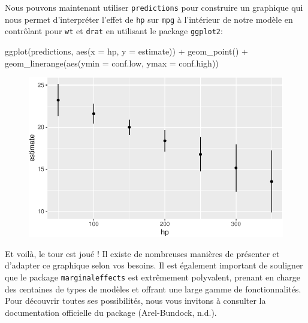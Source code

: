\documentclass[
  letterpaper,
  DIV=11,
  numbers=noendperiod]{scrreprt}
\newenvironment{Shaded}{\begin{snugshade}}{\end{snugshade}}
\newcommand{\AttributeTok}[1]{\textcolor[rgb]{0.40,0.45,0.13}{#1}}
\newcommand{\FunctionTok}[1]{\textcolor[rgb]{0.28,0.35,0.67}{#1}}
\newcommand{\NormalTok}[1]{\textcolor[rgb]{0.00,0.23,0.31}{#1}}
\newcommand{\SpecialCharTok}[1]{\textcolor[rgb]{0.37,0.37,0.37}{#1}}
\begin{document}
Nous pouvons maintenant utiliser \texttt{predictions} pour construire un
graphique qui nous permet d'interpréter l'effet de \texttt{hp} sur
\texttt{mpg} à l'intérieur de notre modèle en contrôlant pour
\texttt{wt} et \texttt{drat} en utilisant le package \texttt{ggplot2}:

\begin{Shaded}
\begin{Highlighting}[]
\FunctionTok{ggplot}\NormalTok{(predictions, }\FunctionTok{aes}\NormalTok{(}\AttributeTok{x =}\NormalTok{ hp, }\AttributeTok{y =}\NormalTok{ estimate)) }\SpecialCharTok{+}
      \FunctionTok{geom\_point}\NormalTok{() }\SpecialCharTok{+}
      \FunctionTok{geom\_linerange}\NormalTok{(}\FunctionTok{aes}\NormalTok{(}\AttributeTok{ymin =}\NormalTok{ conf.low, }\AttributeTok{ymax =}\NormalTok{ conf.high))}
\end{Highlighting}
\end{Shaded}

\begin{figure}[H]

{\centering \includegraphics{chapitre_6_files/figure-pdf/unnamed-chunk-11-1.pdf}

}

\end{figure}

Et voilà, le tour est joué ! Il existe de nombreuses manières de
présenter et d'adapter ce graphique selon vos besoins. Il est également
important de souligner que le package \texttt{marginaleffects} est
extrêmement polyvalent, prenant en charge des centaines de types de
modèles et offrant une large gamme de fonctionnalités. Pour découvrir
toutes ses possibilités, nous vous invitons à consulter la documentation
officielle du package (Arel-Bundock, n.d.).
\end{document}
